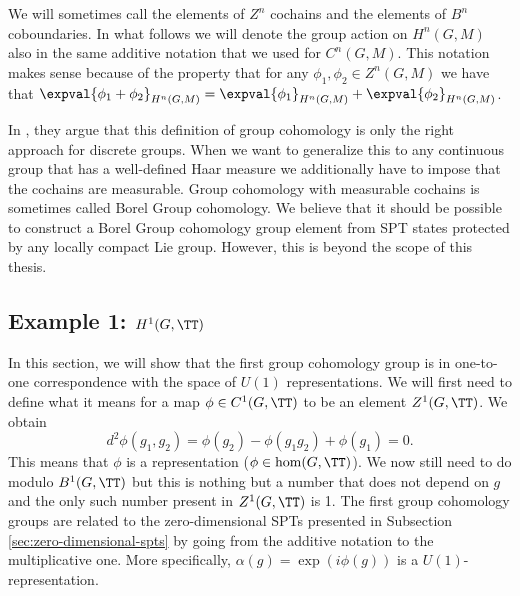 We will sometimes call the elements of $Z^n$ cochains and the elements of $B^n$ coboundaries. In what follows we will denote the group action on $H^n(G,M)$ also in the same additive notation that we used for $C^n(G,M)$. This notation makes sense because of the property that for any $\phi_1,\phi_2\in Z^n(G,M)$ we have that $\expval{\phi_1+\phi_2}_{H^n(G,M)}=\expval{\phi_1}_{H^n(G,M)}+\expval{\phi_2}_{H^n(G,M)}$.
\begin{remark}
	In \cite{Chen_2013}, they argue that this definition of group cohomology is only the right approach for discrete groups. When we want to generalize this to any continuous group that has a well-defined Haar measure we additionally have to impose that the cochains are measurable. Group cohomology with measurable cochains is sometimes called Borel Group cohomology. We believe that it should be possible to construct a Borel Group cohomology group element from SPT states protected by any locally compact Lie group. However, this is beyond the scope of this thesis.
\end{remark}
\subsection{Example 1: \texorpdfstring{$H^1(G,\TT)$}{H1}}\label{sec:example-1-h1gtt}
In this section, we will show that the first group cohomology group is in one-to-one correspondence with the space of $U(1)$ representations. We will first need to define what it means for a map $\phi\in C^1(G, \TT)$ to be an element $Z^1(G,\TT)$. We obtain
\begin{equation}
d^2\phi(g_1,g_2)=\phi(g_2)-\phi(g_1g_2)+\phi(g_1)=0.
\end{equation}
This means that $\phi$ is a representation ($\phi\in\hom(G,\TT)$). We now still need to do modulo $B^1(G,\TT)$ but this is nothing but a number that does not depend on $g$ and the only such number present in $Z^1(G,\TT)$ is 1. The first group cohomology groups are related to the zero-dimensional SPTs presented in Subsection \ref{sec:zero-dimensional-spts} by going from the additive notation to the multiplicative one. More specifically, $\alpha(g)=\exp(i\phi(g))$ is a $U(1)$-representation.
